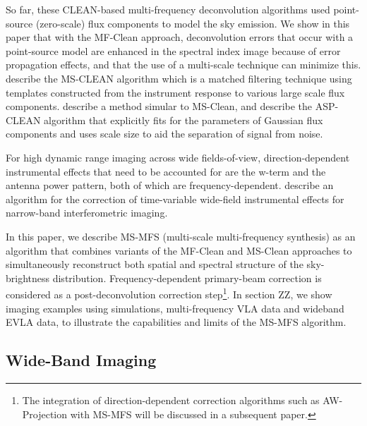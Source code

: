 \documentclass[structabstract]{stylefiles/aa}
\begin{document}
So far, these CLEAN-based multi-frequency deconvolution algorithms used 
point-source (zero-scale) flux components to model the sky emission.
We show in this paper that with the MF-Clean approach, 
deconvolution errors that occur with a point-source
model are enhanced in the spectral index image because of error propagation effects, and
that the use of a multi-scale technique can minimize this.
%
\citep{MSCLEAN} describe the MS-CLEAN algorithm which is a 
matched filtering technique using templates constructed from the instrument 
response to various large scale flux components. 
\citep{ERIC_MSCLEAN} describe a method simular to MS-Clean, and 
\citep{Asp_Clean} describe the ASP-CLEAN algorithm that explicitly fits 
for the parameters of Gaussian flux components and uses scale size to aid the separation of
signal from noise.

For high dynamic range imaging across wide fields-of-view,
direction-dependent instrumental effects that need to be accounted for are 
the w-term and the antenna power pattern, both of which are frequency-dependent. 
\citep{AWProjection}describe an algorithm for the correction of time-variable
wide-field instrumental effects for narrow-band interferometric imaging. 

In this paper, we describe MS-MFS (multi-scale multi-frequency synthesis) as
an algorithm that combines variants of the MF-Clean and MS-Clean
approaches to simultaneously reconstruct both spatial and spectral structure of the 
sky-brightness distribution. 
Frequency-dependent primary-beam correction is considered as a 
post-deconvolution correction step\footnote{The integration of 
direction-dependent correction algorithms such as AW-Projection
with MS-MFS will be discussed in a subsequent paper.}.
In section ZZ, we show imaging examples using simulations, multi-frequency VLA data
 and wideband EVLA data,  to illustrate the capabilities and limits of the
MS-MFS algorithm. 


\subsection{Wide-Band Imaging}\label{Sec:WIDEBANDIMAGING}
\end{document}
